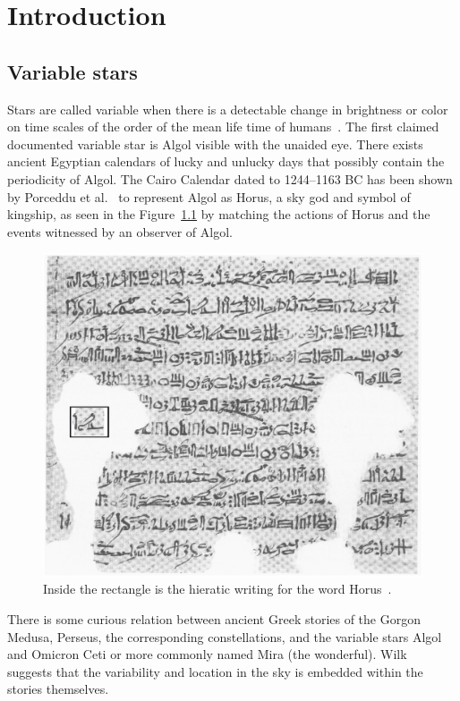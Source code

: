 \chapter{Introduction}
\label{ch:intro}

\section{Variable stars}
Stars are called variable when there is a detectable change in brightness or color on time scales of the order
of the mean life time of humans~\cite{percy_2007, sterken_1996}.
The first claimed documented variable star is Algol visible with the unaided eye.
There exists ancient Egyptian calendars of lucky and unlucky days that possibly contain the periodicity of Algol\cite{porceddu_2008, porceddu_2018}.
The Cairo Calendar dated to 1244--1163 BC has been shown by Porceddu et al.~\cite{porceddu_2015} to represent Algol as Horus, a sky god and
symbol of kingship,
as seen in the Figure~\ref{fig:horus} by matching the actions of Horus and the events witnessed by an observer of Algol.

\begin{figure}[h]
    \centering
    \includegraphics[width=\columnwidth]{figures/horus.eps}
    \caption{Inside the rectangle is the hieratic writing for the word Horus~\protect\cite{porceddu_2015}.}
\label{fig:horus}
\end{figure}

There is some curious relation between ancient Greek stories of the Gorgon Medusa, Perseus, the corresponding constellations, 
and the variable stars Algol and Omicron Ceti or more commonly named Mira (the wonderful).
Wilk~\cite{wilk_1996} suggests that the variability and location in the sky is embedded within the stories themselves.

